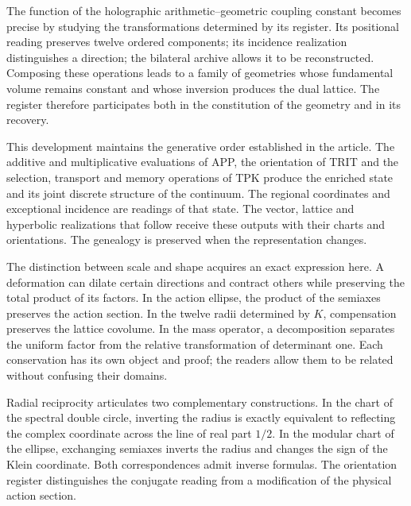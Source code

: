 \label{x_reciprocidad:rec:apertura}

The function of the holographic arithmetic--geometric coupling constant becomes precise by studying the transformations determined by its register. Its positional reading preserves twelve ordered components; its incidence realization distinguishes a direction; the bilateral archive allows it to be reconstructed. Composing these operations leads to a family of geometries whose fundamental volume remains constant and whose inversion produces the dual lattice. The register therefore participates both in the constitution of the geometry and in its recovery.

This development maintains the generative order established in the article. The additive and multiplicative evaluations of APP, the orientation of TRIT and the selection, transport and memory operations of TPK produce the enriched state and its joint discrete structure of the continuum. The regional coordinates and exceptional incidence are readings of that state. The vector, lattice and hyperbolic realizations that follow receive these outputs with their charts and orientations. The genealogy is preserved when the representation changes.

The distinction between scale and shape acquires an exact expression here. A deformation can dilate certain directions and contract others while preserving the total product of its factors. In the action ellipse, the product of the semiaxes preserves the action section. In the twelve radii determined by \(K\), compensation preserves the lattice covolume. In the mass operator, a decomposition separates the uniform factor from the relative transformation of determinant one. Each conservation has its own object and proof; the readers allow them to be related without confusing their domains.

Radial reciprocity articulates two complementary constructions. In the chart of the spectral double circle, inverting the radius is exactly equivalent to reflecting the complex coordinate across the line of real part \(1/2\). In the modular chart of the ellipse, exchanging semiaxes inverts the radius and changes the sign of the Klein coordinate. Both correspondences admit inverse formulas. The orientation register distinguishes the conjugate reading from a modification of the physical action section.

